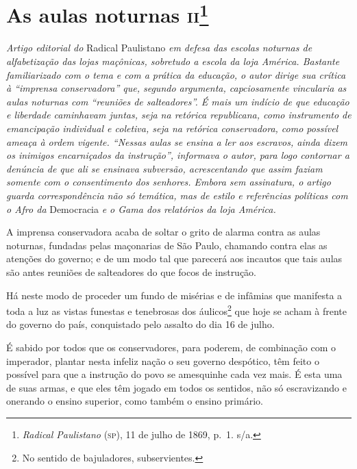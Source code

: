 \chapter{As aulas noturnas \textsc{ii}\footnote{\emph{Radical Paulistano}
  (\textsc{sp}), 11 de julho de 1869, p.~1. s/a.}}

\begin{didascalia}
\emph{Artigo editorial do} Radical Paulistano \emph{em defesa das escolas
noturnas de alfabetização das lojas maçônicas, sobretudo a escola da
loja América. Bastante familiarizado com o tema e com a prática da
educação, o autor dirige sua crítica à ``imprensa conservadora'' que,
segundo argumenta, capciosamente vincularia as aulas noturnas com
``reuniões de salteadores''. É mais um indício de que educação e liberdade
caminhavam juntas, seja na retórica republicana, como instrumento de
emancipação individual e coletiva, seja na retórica conservadora, como
possível ameaça à ordem vigente. ``Nessas aulas se ensina a ler aos
escravos, ainda dizem os inimigos encarniçados da instrução'', informava
o autor, para logo contornar a denúncia de que ali se ensinava
subversão, acrescentando que assim faziam somente com o consentimento
dos senhores. Embora sem assinatura, o artigo guarda correspondência não
só temática, mas de estilo e referências políticas com o Afro da}
Democracia \emph{e o Gama dos relatórios da loja América.}
\end{didascalia}

A imprensa conservadora acaba de soltar o grito de alarma contra as
aulas noturnas, fundadas pelas maçonarias de São Paulo, chamando contra
elas as atenções do governo; e de um modo tal que parecerá aos incautos
que tais aulas são antes reuniões de salteadores do que focos de
instrução.

Há neste modo de proceder um fundo de misérias e de infâmias que
manifesta a toda a luz as vistas funestas e tenebrosas dos
áulicos\footnote{No sentido de bajuladores, subservientes.} que hoje
se acham à frente do governo do país, conquistado pelo assalto do dia 16
de julho.

É sabido por todos que os conservadores, para poderem, de combinação com
o imperador, plantar nesta infeliz nação o seu governo despótico, têm
feito o possível para que a instrução do povo se amesquinhe cada vez
mais. É esta uma de suas armas, e que eles têm jogado em todos os
sentidos, não só escravizando e onerando o ensino superior, como também
o ensino primário.

